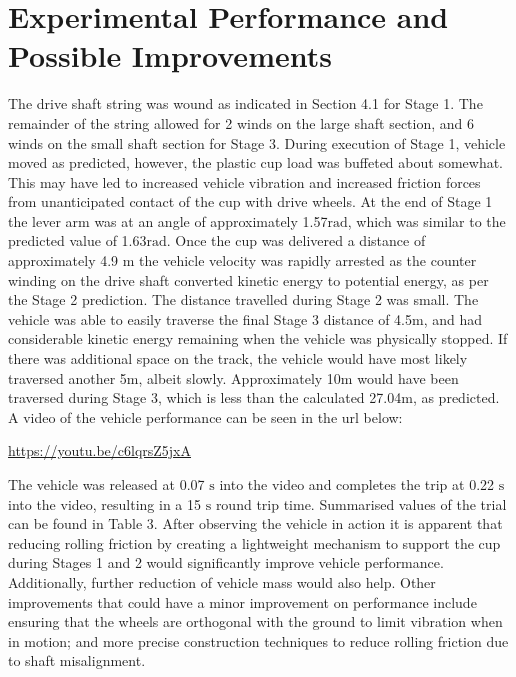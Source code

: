 \documentclass[a4paper]{article}
\begin{document}
\section{Experimental Performance and Possible Improvements}
The drive shaft string was wound as indicated in Section 4.1 for Stage 1. The remainder of the string allowed for 2 winds on the large shaft section, and 6 winds on the small shaft section for Stage 3. During execution of Stage 1, vehicle moved as predicted, however, the plastic cup load was buffeted about somewhat. This may have led to increased vehicle vibration and increased friction forces from unanticipated contact of the cup with drive wheels. At the end of Stage 1 the lever arm was at an angle of approximately 1.57$\si{\radian}$, which was similar to the predicted value of 1.63$\si{\radian}$. Once the cup was delivered a distance of approximately 4.9 $\si{\meter}$ the vehicle velocity was rapidly arrested as the counter winding on the drive shaft converted kinetic energy to potential energy, as per the Stage 2 prediction. The distance travelled during Stage 2 was small. The vehicle was able to easily traverse the final Stage 3 distance of 4.5$\si{\meter}$, and had considerable kinetic energy remaining when the vehicle was physically stopped. If there was additional space on the track, the vehicle would have most likely traversed another 5$\si{\meter}$, albeit slowly. Approximately 10$\si{\meter}$ would have been traversed during Stage 3, which is less than the calculated 27.04$\si{\meter}$, as predicted. A video of the vehicle performance can be seen in the url below:
\begin{center}
	\url{https://youtu.be/c6lqrsZ5jxA}
\end{center}

The vehicle was released at 0.07 $\si{\second}$ into the video and completes the trip at 0.22 $\si{\second}$ into the video, resulting in a 15 $\si{\second}$ round trip time. Summarised values of the trial can be found in Table 3. After observing the vehicle in action it is apparent that reducing rolling friction by creating a lightweight mechanism to support the cup during Stages 1 and 2 would significantly improve vehicle performance. Additionally, further reduction of vehicle mass would also help. Other improvements that could have a minor improvement on performance include ensuring that the wheels are orthogonal with the ground to limit vibration when in motion; and more precise construction techniques to reduce rolling friction due to shaft misalignment.
\end{document}
